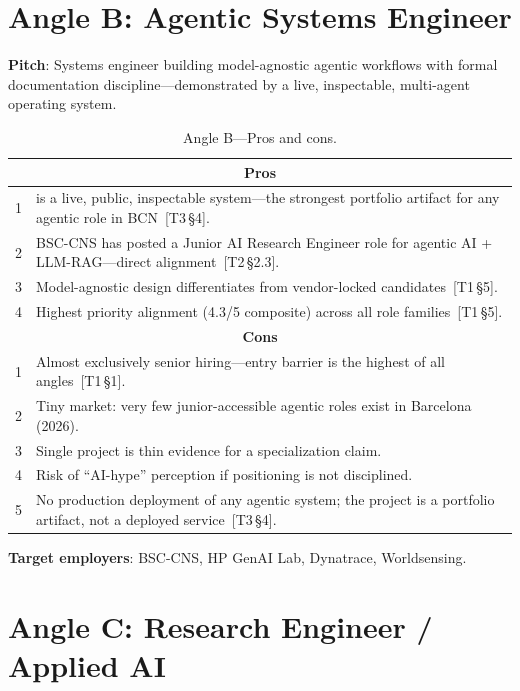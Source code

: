 \documentclass[a4paper,11pt,openany]{report}
\begin{document}
\section{Angle B: Agentic Systems Engineer}

\textbf{Pitch}: Systems engineer building model-agnostic agentic workflows
with formal documentation discipline---demonstrated by a live, inspectable,
multi-agent operating system.

\begin{table}[htbp]
\centering
\caption{Angle B---Pros and cons.}
\label{tab:angle-b}
\small
\begin{tabularx}{\textwidth}{c X}
\toprule
\multicolumn{2}{c}{\textbf{Pros}} \\
\midrule
1 & \projectName{} is a live, public, inspectable system---the strongest portfolio artifact for any agentic role in BCN~[T3\,§4]. \\
2 & BSC-CNS has posted a Junior AI Research Engineer role for agentic AI + LLM-RAG---direct alignment~[T2\,§2.3]. \\
3 & Model-agnostic design differentiates from vendor-locked candidates~[T1\,§5]. \\
4 & Highest priority alignment (4.3/5 composite) across all role families~[T1\,§5]. \\
\midrule
\multicolumn{2}{c}{\textbf{Cons}} \\
\midrule
1 & Almost exclusively senior hiring---entry barrier is the highest of all angles~[T1\,§1]. \\
2 & Tiny market: very few junior-accessible agentic roles exist in Barcelona (2026). \\
3 & Single project is thin evidence for a specialization claim. \\
4 & Risk of ``AI-hype'' perception if positioning is not disciplined. \\
5 & No production deployment of any agentic system; the project is a portfolio artifact, not a deployed service~[T3\,§4]. \\
\bottomrule
\end{tabularx}
\end{table}

\textbf{Target employers}: BSC-CNS, HP GenAI Lab, Dynatrace, Worldsensing.

\section{Angle C: Research Engineer / Applied AI}
\end{document}
